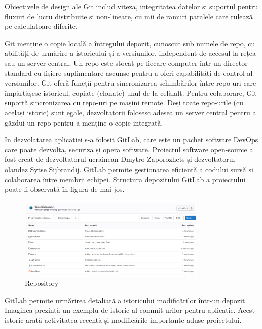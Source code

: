 \documentclass[a4paper,12pt]{report}
\begin{document}
Obiectivele de design ale Git includ viteza, integritatea datelor și suportul pentru fluxuri de lucru distribuite și non-lineare, cu mii de ramuri paralele care rulează pe calculatoare diferite.

Git menține o copie locală a întregului depozit, cunoscut sub numele de repo, cu abilități de urmărire a istoricului și a versiunilor, independent de accesul la rețea sau un server central. Un repo este stocat pe fiecare computer într-un director standard cu fișiere suplimentare ascunse pentru a oferi capabilități de control al versiunilor. Git oferă funcții pentru sincronizarea schimbărilor între repo-uri care împărtășesc istoricul, copiate (clonate) unul de la celălalt. Pentru colaborare, Git suportă sincronizarea cu repo-uri pe mașini remote. Deși toate repo-urile (cu același istoric) sunt egale, dezvoltatorii folosesc adesea un server central pentru a găzdui un repo pentru a menține o copie integrată.

In dezvolatarea aplicației s-a folosit GitLab, care este un pachet software DevOps care poate dezvolta, securiza și opera software. Proiectul software open-source a fost creat de dezvoltatorul ucrainean Dmytro Zaporozhets și dezvoltatorul olandez Sytse Sijbrandij. GitLab permite gestionarea eficientă a codului sursă și colaborarea între membrii echipei. Structura depozitului GitLab a proiectului poate fi observată în figura de mai jos.

\begin{figure}[h!]
    \centering
    \includegraphics[width=0.8\textwidth]{images/gitlab.jpg}
    \caption{Repository}
\end{figure}
\FloatBarrier

GitLab permite urmărirea detaliată a istoricului modificărilor într-un depozit. Imaginea prezintă un exemplu de istoric al commit-urilor pentru aplicatie. Acest istoric arată activitatea recentă și modificările importante aduse proiectului.
\end{document}
